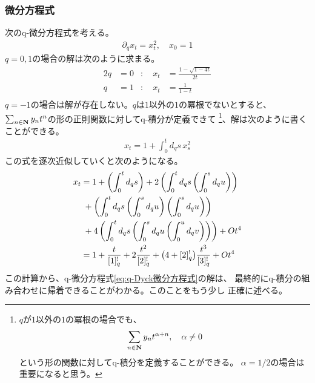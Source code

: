 {\subsubsection{微分方程式}\label{s3:微分方程式} %
	次のq-微分方程式を考える。
	\begin{equation}\label{eq:q-Dyck微分方程式}\begin{split}
		\partial_qx_t = x_t^2,\quad x_0 = 1
	\end{split}\end{equation}
	$q=0,1$の場合の解は次のように求まる。
	\begin{alignat*}{2}
		q &= 0 &:\quad x_t &= \frac{1-\sqrt{1 - 4t}}{2t} \\
		q &= 1 &:\quad x_t &= \frac{1}{1 - t} \\
	\end{alignat*}
	$q=-1$の場合は解が存在しない。$q$は$1$以外の$1$の冪根でないとすると、
	$\sum_{n\in\mathbf{N}}y_nt^n$の形の正則関数に対してq-積分が定義できて
	\footnote{
		$q$が$1$以外の$1$の冪根の場合でも、
		\begin{equation*}\begin{split}
			\sum_{n\in\mathbf{N}}y_nt^{\alpha+n},\quad \alpha\neq0
		\end{split}\end{equation*}
		という形の関数に対してq-積分を定義することができる。
		$\alpha=1/2$の場合は重要になると思う。
	}、解は次のように書くことができる。
	\begin{equation*}\begin{split}
		x_t = 1 + \int_0^td_qs\, x_s^2 
	\end{split}\end{equation*}
	この式を逐次近似していくと次のようになる。
	\begin{equation*}\begin{split}
		x_t &= 1 + \left({\int_0^td_qs}\right) + 2\left({\int_0^td_qs\left({\int_0^sd_qu}\right)}\right) \\
		&\;+ \left({\int_0^td_qs\left({\int_0^sd_qu}\right)\left({\int_0^sd_qu}\right)}\right) \\
		&\;+ 4\left({\int_0^td_qs\left({\int_0^sd_qu\left({\int_0^ud_qv}\right)}\right)}\right) + Ot^4 \\
		&= 1 + \frac{t}{[1]_q^!} + 2\frac{t^2}{[2]_q^!}
		+ \bigl({4 + [2]_q^!}\bigr)\frac{t^3}{[3]_q^!} + Ot^4 \\
	\end{split}\end{equation*}
	この計算から、q-微分方程式\eqref{eq:q-Dyck微分方程式}の解は、
	最終的にq-積分の組み合わせに帰着できることがわかる。このことをもう少し
	正確に述べる。

}
